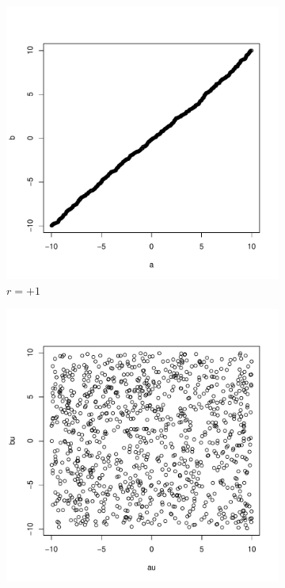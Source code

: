 \begin{figure}[h!]
\centering
\begin{subfigure}[b]{0.3\textwidth}
\includegraphics{begriffe-009}
\caption{$r=+1$}
\end{subfigure}
\begin{subfigure}[b]{0.3\textwidth}
\includegraphics{begriffe-010}

\end{subfigure}
\end{figure}
